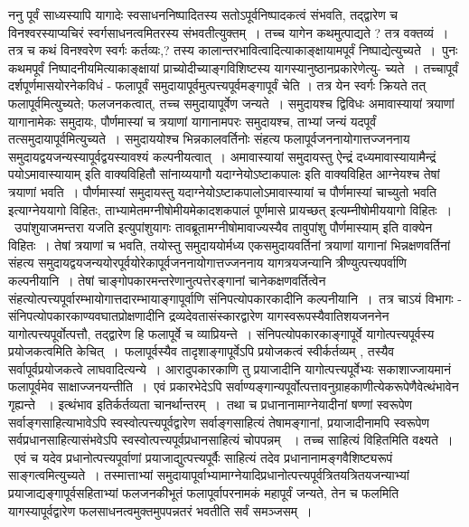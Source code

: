 \documentclass[11pt, openany]{book}
\begin{document}
 {\br ननु} पूर्वं साध्यस्यापि यागादेः स्वसाधननिष्पादितस्य सतोऽपूर्वनिष्पादकत्वं संभवति, तद्द्वारेण च विनश्वरस्याप्यचिरं स्वर्गसाधनत्वमितरस्य संभवतीत्युक्तम्~। तच्च यागेन कथमुत्पाद्यते ? तत्र वक्तव्यं~। तत्र च कथं विनश्वरेण स्वर्गः कर्तव्यः,? {\qt तस्य
कालान्तरभावित्वादित्याकाङ्क्षायामपूर्वं निष्पाद्येत्युच्यते~}।~पुनः कथमपूर्वं निष्पादनीयमित्याकाङ्क्षायां प्राच्योदीच्याङ्गविशिष्टस्य यागस्यानुष्ठानप्रकारेणेत्यु- 
\newpage
\fancyhead[LO]{अंशत्रयम् ]} 
\noindent
च्यते~। तच्चापूर्वं दर्शपूर्णमासयोरनेकविधं - फलापूर्वं समुदायापूर्वमुत्पत्त्यपूर्वमङ्गापूर्वं चेति । तत्र येन स्वर्गः क्रियते तत् फलापूर्वमित्युच्यते; फलजनकत्वात्, तच्च समुदायापूर्वेण जन्यते~। समुदायश्च द्विविधः {\qt अमावास्यायां त्रयाणां यागानामेकः समुदायः, पौर्णमास्यां च त्रयाणां यागानामपरः समुदायश्च}, ताभ्यां जन्यं यदपूर्वं तत्समुदायापूर्वमित्युच्यते~। समुदाययोश्च भिन्नकालवर्तिनोः संहत्य फलापूर्वजननायोगात्तज्जननाय समुदायद्वयजन्यस्यापूर्वद्वयस्यावश्यं कल्पनीयत्वात्~। अमावास्यायां समुदायस्तु {\qt ऐन्द्रं दध्यमावास्यायामैन्द्रं  पयोऽमावास्यायाम्} इति वाक्यविहितौ सांनाय्ययागौ {\qt यदाग्नेयोऽष्टाकपालः} इति वाक्यविहित आग्नेयश्च तेषां त्रयाणां भवति~। पौर्णमास्यां
समुदायस्तु {\qt यदाग्नेयोऽष्टाकपालोऽमावास्यायां च पौर्णमास्यां चाच्युतो भवति} इत्याग्नेययागो विहितः, {\qt ताभ्यामेतमग्नीषोमीयमेकादशकपालं पूर्णमासे
प्रायच्छत्} इत्यम्नीषोमीययागो विहितः~।~{\qt उपांशुयाजमन्तरा यजति} इत्युपांशुयागः {\qt तावब्रूतामग्नीषोमावाज्यस्यैव तावुपांशु पौर्णमास्याम्} इति वाक्येन विहितः~। तेषां त्रयाणां च भवति, तयोस्तु समुदाययोर्मध्य एकसमुदायवर्तिनां त्रयाणां यागानां भिन्नक्षणवर्तिनां संहत्य समुदायद्वयजन्ययोरपूर्वयोरेकापूर्वजननायोगात्तज्जननाय यागत्रयजन्यानि
त्रीण्युत्पत्त्यपर्वाणि कल्पनीयानि~। तेषां चाङ्गोपकारमन्तरेणानुत्पत्तेरङ्गानां चानेकक्षणवर्तित्वेन संहत्योत्पत्त्यपूर्वारम्भायोगात्तदारम्भायाङ्गापूर्वाणि संनिपत्योपकारकादीनि कल्पनीयानि~।~तत्र चाऽयं विभागः - संनिपत्योपकारकाण्यवघातप्रोक्षणादीनि द्रव्यदेवतासंस्कारद्वारेण यागस्वरूपस्यैवातिशयजननेन यागोत्पत्त्यपूर्वोत्पत्तौ, तद्द्वारेण हि
फलापूर्वे च व्याप्रियन्ते~। संनिपत्योपकारकाङ्गापूर्वे यागोत्पत्त्यपूर्वस्य प्रयोजकत्वमिति केचित्~।~फलापूर्वस्यैव तादृशाङ्गापूर्वेऽपि प्रयोजकत्वं स्वीर्कर्तव्यम् , तस्यैव
सर्वापूर्वप्रयोजकत्वे लाघवादित्यन्ये~। आरादुपकारकाणि तु प्रयाजादीनि यागोत्पत्त्यपूर्वेभ्यः सकाशाज्जायमानं फलापूर्वमेव साक्षाज्जनयन्तीति~।~एवं प्रकारभेदेऽपि
सर्वाण्यङ्गान्यपूर्वोत्पत्तावनुग्राहकाणीत्येकरूपेणैवेत्थंभावेन गृह्यन्ते ~। इत्थंभाव इतिर्कर्तव्यता चानर्थान्तरम्~।~तथा च प्रधानानामाग्नेयादीनां षण्णां स्वरूपेण सर्वाङ्गसाहित्याभावेऽपि स्वस्वोत्पत्त्यपूर्वद्वारेण सर्वाङ्गसाहित्यं तेषामङ्गानां, प्रयाजादीनामपि स्वरूपेण सर्वप्रधानसाहित्यासंभवेऽपि स्वस्वोत्पत्त्यपूर्वप्रधानसाहित्यं चोपपन्नम्
~। तच्च साहित्यं
\newpage
\fancyhead[RE]{[ आर्थीभावनाया}
\noindent
विहितमिति वक्ष्यते~।~एवं च यदेव प्रधानोत्पत्त्यपूर्वाणां प्रयाजाद्युत्पत्त्यपूर्वैः साहित्यं तदेव प्रधानानामङ्गवैशिष्ट्यरूपं साङ्गत्वमित्युच्यते~। तस्मात्ताभ्यां समुदायापूर्वाभ्यामाग्नेयादिप्रधानोत्पत्त्यपूर्वत्रितयत्रितयजन्याभ्यां प्रयाजाद्यङ्गापूर्वसहिताभ्यां फलजनकीभूतं फलापूर्वापरनामकं महापूर्वं जन्यते, तेन च फलमिति यागस्यापूर्वद्वारेण फलसाधनत्वमुक्तमुपपन्नतरं भवतीति सर्वं समञ्जसम्~।\\
\end{document}

